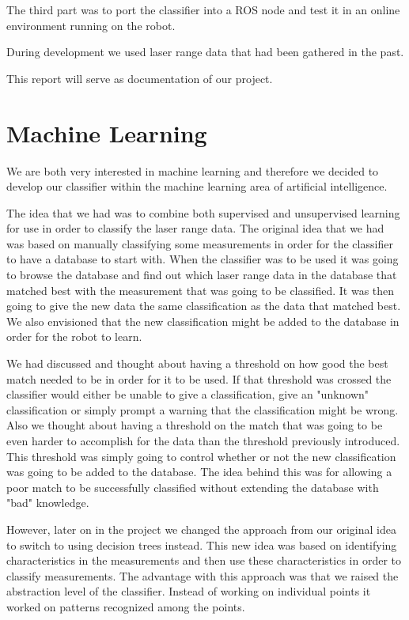 \documentclass[a4paper, 10pt, conference]{ieeeconf}      %
\begin{document}
The third part was to port the classifier into a ROS node and test it in an online environment running on the robot. 

During development we used laser range data that had been gathered in the past.

This report will serve as documentation of our project.

\section{Machine Learning}
We are both very interested in machine learning and therefore we decided to develop our classifier within the machine learning area of artificial intelligence.

The idea that we had was to combine both supervised and unsupervised learning for use in order to classify the laser range data. The original idea that we had was based on manually classifying some measurements in order for the classifier to have a database to start with. When the classifier was to be used it was going to browse the database and find out which laser range data in the database that matched best with the measurement that was going to be classified. It was then going to give the new data the same classification as the data that matched best. We also envisioned that the new classification might be added to the database in order for the robot to learn.

We had discussed and thought about having a threshold on how good the best match needed to be in order for it to be used. If that threshold was crossed the classifier would either be unable to give a classification, give an "unknown" classification or simply prompt a warning that the classification might be wrong. Also we thought about having a threshold on the match that was going to be even harder to accomplish for the data than the threshold previously introduced. This threshold was simply going to control whether or not the new classification was going to be added to the database. The idea behind this was for allowing a poor match to be successfully classified without extending the database with "bad" knowledge.

However, later on in the project we changed the approach from our original idea to switch to using decision trees instead. This new idea was based on identifying characteristics in the measurements and then use these characteristics in order to classify measurements. The advantage with this approach was that we raised the abstraction level of the classifier. Instead of working on individual points it worked on patterns recognized among the points.
\end{document}
